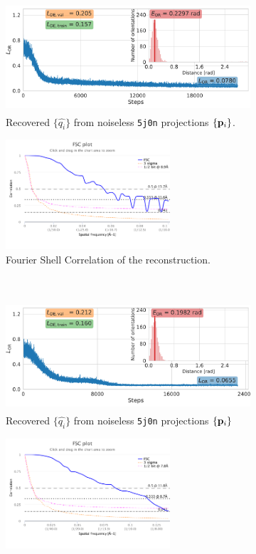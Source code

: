 \begin{figure}[ht!]
    \centering
    \begin{subfigure}[b]{0.55\linewidth}
        \centering
        \includegraphics[height=11em]{figures/5j0n_ar_aa_fullcvg.pdf}
        \caption{Recovered $\{ \widehat{q_i} \}$ from noiseless \texttt{5j0n} projections $\{ \mathbf{p}_i \}$.}
    \end{subfigure}
    \hfill
    \begin{subfigure}[b]{0.4\linewidth}
        \centering
        \includegraphics[height=11em]{figures/FSC_5j0n_gt_5j0n_apr_fullcvg.pdf}
        \caption{Fourier Shell Correlation of the reconstruction.}
    \end{subfigure}
    \\ \vspace{1em}
    \begin{subfigure}[b]{0.55\linewidth}
        \centering
        \includegraphics[height=11em]{figures/5j0n_ar_aa_fullcvg_uniform2.pdf}
        \caption{Recovered $\{ \widehat{q_i} \}$ from noiseless \texttt{5j0n} projections $\{ \mathbf{p}_i \}$}
    \end{subfigure}
    \hfill
    \begin{subfigure}[b]{0.4\linewidth}
        \centering
        \includegraphics[height=11em]{figures/FSC_5j0n_gt_5j0n_apr_fullcvg_uniform2.pdf}

\end{subfigure}
\end{figure}
